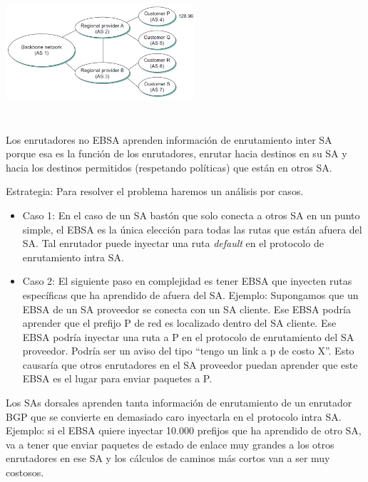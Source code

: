 	\begin{center}
		\includegraphics[width=7cm, height=5cm]{./imagenes/fig2.png}
	\end{center}

	\par Los enrutadores no EBSA aprenden información de enrutamiento inter SA porque esa es la función de los enrutadores, enrutar hacia destinos en su SA y hacia los destinos permitidos (respetando políticas) que están en otros SA.

	\par Estrategia: Para resolver el problema haremos un análisis por casos.

	\begin{itemize}
		\item Caso 1: En el caso de un SA bastón que solo conecta a otros SA en un punto simple, el EBSA es la única elección para todas las rutas que están afuera del SA. Tal enrutador puede inyectar una ruta \textit{default} en el protocolo de enrutamiento intra SA.
		\item Caso 2: El siguiente paso en complejidad es tener EBSA que inyecten rutas específicas que ha aprendido de afuera del SA. Ejemplo: Supongamos que un EBSA de un SA proveedor se conecta con un SA cliente. Ese EBSA podría aprender que el prefijo P de red es localizado dentro del SA cliente. Ese EBSA podría inyectar una ruta a P en el protocolo de enrutamiento del SA proveedor. Podría ser un aviso del tipo “tengo un link a p de costo X”. Esto causaría que otros enrutadores en el SA proveedor puedan aprender que este EBSA es el lugar para enviar paquetes a P.
	\end{itemize}

		\par Los SAs dorsales aprenden tanta información de enrutamiento de un enrutador BGP que se convierte en demasiado caro inyectarla en el protocolo intra SA. Ejemplo: si el EBSA quiere inyectar 10.000 prefijos que ha aprendido de otro SA, va a tener que enviar paquetes de estado de enlace muy grandes a los otros enrutadores en ese SA y los cálculos de caminos más cortos van a ser muy costosos.


